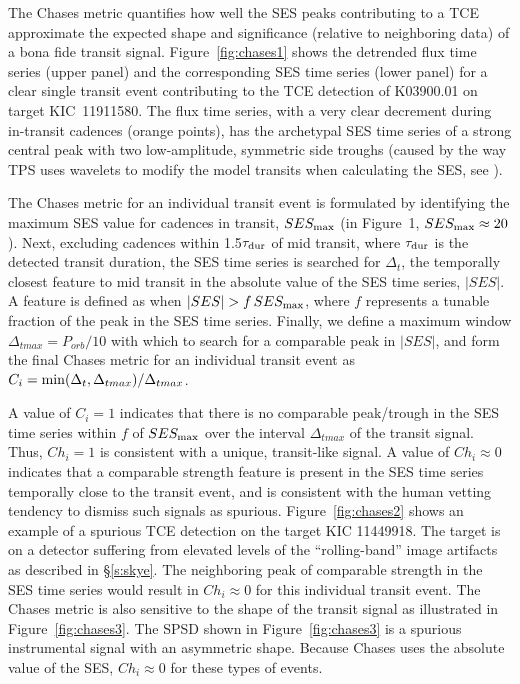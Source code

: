 The Chases metric quantifies how well the SES peaks contributing to a TCE approximate the expected shape and significance (relative to neighboring data) of a bona fide transit signal.  Figure~\ref{fig:chases1} shows the detrended flux time series (upper panel) and the corresponding SES time series (lower panel) for a clear single transit event contributing to the TCE detection of K03900.01 on target KIC~11911580.  The flux time series, with a very clear decrement during in-transit cadences (orange points), has the archetypal SES time series of a strong central peak with two low-amplitude, symmetric side troughs (caused by the way TPS uses wavelets to modify the model transits when calculating the SES, see \citealt{JenkinsKDPH}). 

The Chases metric for an individual transit event is formulated by identifying the maximum SES value for cadences in transit, $SES_{\rm max}$ (in Figure~1, $SES_{\rm max}\approx20$).  Next, excluding cadences within 1.5$\tau_{\rm dur}$ of mid transit, where $\tau_{\rm dur}$ is the detected transit duration, the SES time series is searched for $\Delta_{t}$, the temporally closest feature to mid transit in the absolute value of the SES time series, $\lvert SES \rvert$. A feature is defined as when  $\lvert SES \rvert>f\, SES_{\rm max}$, where $f$ represents a tunable fraction of the peak in the SES time series.  Finally, we define a maximum window $\Delta_{tmax}=P_{orb}/10$ with which to search for a comparable peak in $\lvert SES \rvert$, and form the final Chases metric for an individual transit event as $C_{i} = {\rm min}(\Delta_{t},\Delta_{tmax})/\Delta_{tmax}$.  

A value of $C_{i}=1$ indicates that there is no comparable peak/trough in the SES time series within $f$ of $SES_{\rm max}$ over the interval $\Delta_{tmax}$ of the transit signal.  Thus, $Ch_{i}=1$ is consistent with a unique, transit-like signal.  A value of $Ch_{i}\approx0$ indicates that a comparable strength feature is present in the SES time series temporally close to the transit event, and is consistent with the human vetting tendency to dismiss such signals as spurious.  Figure~\ref{fig:chases2} shows an example of a spurious TCE detection on the target KIC 11449918.  The target is on a detector suffering from elevated levels of the ``rolling-band'' image artifacts as described in \S\ref{s:skye}.  The neighboring peak of comparable strength in the SES time series would result in $Ch_{i}\approx0$ for this individual transit event.  The Chases metric is also sensitive to the shape of the transit signal as illustrated in Figure~\ref{fig:chases3}. The SPSD shown in Figure~\ref{fig:chases3} is a spurious instrumental signal with an asymmetric shape. Because Chases uses the absolute value of the SES, $Ch_{i}\approx0$ for these types of events.

